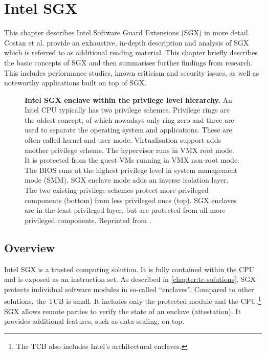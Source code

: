 \chapter{Intel SGX\label{ID_1888222908}\label{chapter:sgx}}
This chapter describes Intel Software Guard Extensions (SGX) in more detail. Costan et al. provide an exhaustive, in-depth description and analysis of SGX which is referred to as additional reading material.\cite[]{sgx-explained}\label{ID_870693712}
This chapter briefly describes the basic concepts of SGX and then summarises further findings from research.\label{ID_147500482}
This includes performance studies, known criticism and security issues, as well as noteworthy applications built on top of SGX.\label{ID_1316984123}
\begin{figure}[htbp]
\makebox[\textwidth][c]{
}\caption{\textbf{Intel SGX enclave within the privilege level hierarchy.}\label{ID_1009832582}
An Intel CPU typically has two privilege schemes.\label{ID_135134113}
Privilege rings are the oldest concept, of which nowadays only ring zero and three are used to separate the operating system and applications. These are often called kernel and user mode.\label{ID_1292196585}
Virtualisation support adds another privilege scheme. The hypervisor runs in VMX root mode. It is protected from the guest VMs running in VMX non-root mode. The BIOS runs at the highest privilege level in system management mode (SMM).\label{ID_394725974}
SGX enclave mode adds an inverse isolation layer. The two existing privilege schemes protect more privileged components (bottom) from less privileged ones (top). SGX enclaves are in the least privileged layer, but are protected from all more privileged components.\label{ID_1068699047}
Reprinted from \cite{sgx-explained}.\label{ID_807064713}
\label{ID_1516228733}\label{figure:sgx-privilege}}
\end{figure}


\section{Overview\label{ID_1052911477}}
Intel SGX is a trusted computing solution. It is fully contained within the CPU and is exposed as an instruction set.\label{ID_1548132428}
As described in \autoref{chapter:tc-solutions}, SGX protects individual software modules in so-called ``enclaves''.\label{ID_884480539}
Compared to other solutions, the TCB is small. It includes only the protected module and the CPU.\footnote{The TCB also includes Intel's architectural enclaves.}\label{ID_1231030834}
SGX allows remote parties to verify the state of an enclave (attestation). It provides additional features, such as data sealing, on top.\label{ID_529967846}

